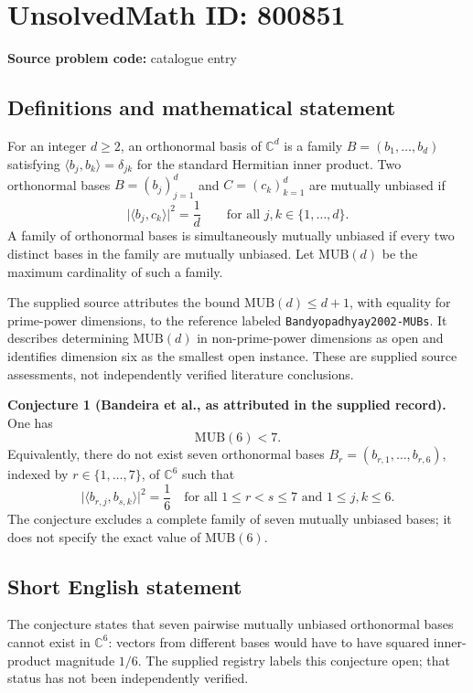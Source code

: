 \documentclass[11pt]{article}
\newcommand{\C}{\mathbb{C}}
\begin{document}
\section*{UnsolvedMath ID: 800851}
\textbf{Source problem code:} catalogue entry
\subsection{Definitions and mathematical statement}
For an integer \(d\geq 2\), an orthonormal basis of \(\C^d\) is a family \(B=(b_1,\ldots,b_d)\) satisfying \(\langle b_j,b_k\rangle=\delta_{jk}\) for the standard Hermitian inner product. Two orthonormal bases \(B=(b_j)_{j=1}^d\) and \(C=(c_k)_{k=1}^d\) are mutually unbiased if
\[
\lvert\langle b_j,c_k\rangle\rvert^2=\frac1d
\qquad\text{for all }j,k\in\{1,\ldots,d\}.
\]
A family of orthonormal bases is simultaneously mutually unbiased if every two distinct bases in the family are mutually unbiased. Let \(\mathrm{MUB}(d)\) be the maximum cardinality of such a family.

The supplied source attributes the bound \(\mathrm{MUB}(d)\leq d+1\), with equality for prime-power dimensions, to the reference labeled \texttt{Bandyopadhyay2002-MUBs}. It describes determining \(\mathrm{MUB}(d)\) in non-prime-power dimensions as open and identifies dimension six as the smallest open instance. These are supplied source assessments, not independently verified literature conclusions.

\textbf{Conjecture 1 (Bandeira et al., as attributed in the supplied record).} One has
\[
\mathrm{MUB}(6)<7.
\]
Equivalently, there do not exist seven orthonormal bases \(B_r=(b_{r,1},\ldots,b_{r,6})\), indexed by \(r\in\{1,\ldots,7\}\), of \(\C^6\) such that
\[
\lvert\langle b_{r,j},b_{s,k}\rangle\rvert^2=\frac16
\quad\text{for all }1\leq r<s\leq7\text{ and }1\leq j,k\leq6.
\]
The conjecture excludes a complete family of seven mutually unbiased bases; it does not specify the exact value of \(\mathrm{MUB}(6)\).
\subsection{Short English statement}
The conjecture states that seven pairwise mutually unbiased orthonormal bases cannot exist in \(\C^6\): vectors from different bases would have to have squared inner-product magnitude \(1/6\). The supplied registry labels this conjecture open; that status has not been independently verified.
\end{document}
